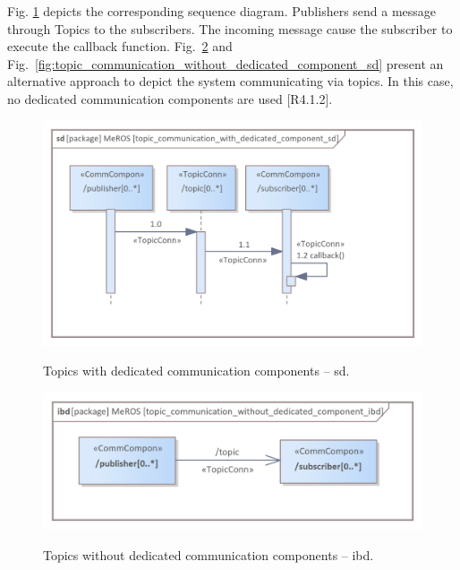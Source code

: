 \documentclass[11pt,oneside,a4paper]{article}
\begin{document}
	
	Fig. \ref{fig:topic_communication_with_dedicated_component_sd} depicts the corresponding sequence diagram. Publishers send a message through Topics to the subscribers. The incoming message cause the subscriber to execute the callback function. 	Fig.~\ref{fig:topic_communication_without_dedicated_component_ibd} and Fig.~\ref{fig:topic_communication_without_dedicated_component_sd} present an alternative approach to depict the system communicating via topics. In this case, no dedicated communication components are used [R4.1.2]. 
	
	\begin{figure}[H]
		\centering
		\begin{center}
			{\includegraphics[scale=1.0]{img/meros_pkg/topic_communication_with_dedicated_component_sd.png}}
		\end{center}
		\caption{Topics with dedicated communication components -- sd.} 
		\label{fig:topic_communication_with_dedicated_component_sd}
	\end{figure}
	
	
	\begin{figure}[H]
		\centering
		\begin{center}
			{\includegraphics[scale=1.0]{img/meros_pkg/topic_communication_without_dedicated_component_ibd.png}}
		\end{center}
		\caption{Topics without dedicated communication components -- ibd.} 
		\label{fig:topic_communication_without_dedicated_component_ibd}
	\end{figure}
	
\end{document}
